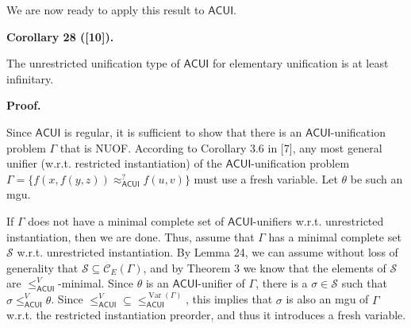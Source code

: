  
 
 
We are now ready to apply this result to $\mathsf{ACUI}$.\par
 
 
 
\par\medskip\noindent\textbf{Corollary 28 ([10]).}\par
 
 
The unrestricted unification type of $\mathsf{ACUI}$ for elementary unification is at least infinitary.\par
 
 
 
 
 
\par\medskip\noindent\textbf{Proof.}\par
 
 
Since $\mathsf{ACUI}$ is regular, it is sufficient to show that there is an $\mathsf{ACUI}$-unification problem $\Gamma$ that is NUOF. According to Corollary 3.6 in [7], any most general unifier (w.r.t. restricted instantiation) of the $\mathsf{ACUI}$-unification problem $\Gamma=\{f(x,f(y,z))\approx_{\mathsf{ACUI}}^{?}f(u,v)\}$ must use a fresh variable. Let $\theta$ be such an mgu.\par
 
 
 
If $\Gamma$ does not have a minimal complete set of $\mathsf{ACUI}$-unifiers w.r.t. unrestricted instantiation, then we are done. Thus, assume that $\Gamma$ has a minimal complete set $\mathcal{S}$ w.r.t. unrestricted instantiation. By Lemma 24, we can assume without loss of generality that $\mathcal{S}\subseteq\mathcal{C}_{E}(\Gamma)$, and by Theorem 3 we know that the elements of $\mathcal{S}$ are $\leq_{\mathsf{ACUI}}^{V}$-minimal. Since $\theta$ is an $\mathsf{ACUI}$-unifier of $\Gamma$, there is a $\sigma\in\mathcal{S}$ such that $\sigma\leq_{\mathsf{ACUI}}^{V}\theta$. Since ${\leq_{\mathsf{ACUI}}^{V}}\subseteq{\leq_{\mathsf{ACUI}}^{\operatorname{Var}(%
\Gamma)}}$, this implies that $\sigma$ is also an mgu of $\Gamma$ w.r.t. the restricted instantiation preorder, and thus it introduces a fresh variable.\par
 

